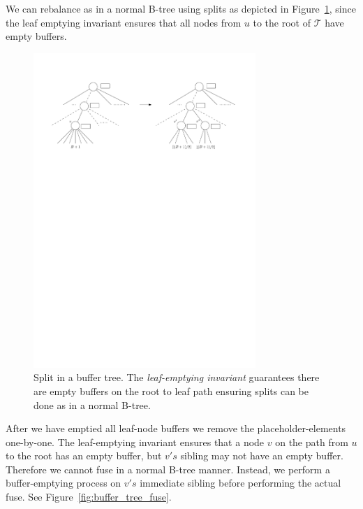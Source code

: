 \documentclass[twoside,11pt,openright]{report}
\begin{document}
We can rebalance as in a normal B-tree using splits as depicted in Figure~\ref{fig:buffer_tree_split}, since the leaf emptying invariant ensures that all nodes from $u$ to the root of $\mathcal{T}$ have empty buffers.

\begin{figure}[H]
	\centering
	\includegraphics[width=0.75\textwidth]{../figures/buffer_tree_split}
	\caption{Split in a buffer tree. The \textit{leaf-emptying invariant} guarantees there are empty buffers on the root to leaf path ensuring splits can be done as in a normal B-tree.}
	\label{fig:buffer_tree_split}
\end{figure}

After we have emptied all leaf-node buffers we remove the placeholder-elements one-by-one. The leaf-emptying invariant ensures that a node $v$ on the path from $u$ to the root has an empty buffer, but $v's$ sibling may not have an empty buffer. Therefore we cannot fuse in a normal B-tree manner. Instead, we perform a buffer-emptying process on $v's$ immediate sibling before performing the actual fuse. See Figure~\ref{fig:buffer_tree_fuse}.
\end{document}
